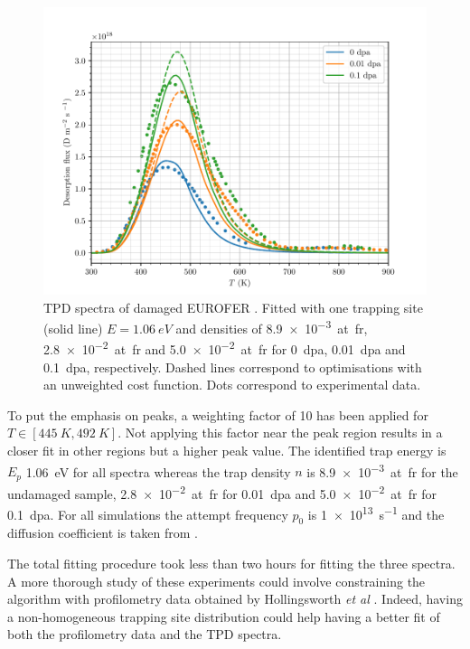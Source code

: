 \begin{figure} [ht]
    \centering
    \includegraphics[width=\linewidth]{Figures/Chapter3/Parametric_optimisation/EUROFER_hollingsworth.pdf}
    \caption{TPD spectra of damaged EUROFER \cite{hollingsworth_comparative_2019}. Fitted with one trapping site (solid line) $E=\SI{1.06}{eV}$ and densities of \SI{8.9e-3}{at.fr}, \SI{2.8e-2}{at.fr} and \SI{5.0e-2}{at.fr} for \SI{0}{dpa}, \SI{0.01}{dpa} and \SI{0.1}{dpa}, respectively. Dashed lines correspond to optimisations with an unweighted cost function. Dots correspond to experimental data.}
    \label{fig:TPD EUROFER}
\end{figure}

To put the emphasis on peaks, a weighting factor of 10 has been applied for $T \in [\SI{445}{K}, \SI{492}{K}]$.
Not applying this factor near the peak region results in a closer fit in other regions but a higher peak value.
The identified trap energy is $E_p$ \SI{1.06}{eV} for all spectra whereas the trap density $n$ is \SI{8.9e-3}{at.fr} for the undamaged sample, \SI{2.8e-2}{at.fr} for \SI{0.01}{dpa} and \newline \SI{5.0e-2}{at.fr} for \SI{0.1}{dpa}.
For all simulations the attempt frequency $p_0$ is \SI{1e13}{s^{-1}} and the diffusion coefficient is taken from .

The total fitting procedure took less than two hours for fitting the three spectra.
A more thorough study of these experiments could involve constraining the algorithm with profilometry data obtained by Hollingsworth \textit{et al} .
Indeed, having a non-homogeneous trapping site distribution could help having a better fit of both the profilometry data and the TPD spectra. 

